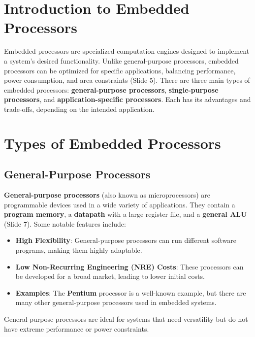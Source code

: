 \documentclass[
  14pt,
  a4paper,
  numbers=noendperiod,
  headinclude=true,
  footinclude=true,
  DIV=calc]{scrreprt}
\begin{document}
\section{Introduction to Embedded
Processors}\label{introduction-to-embedded-processors}

Embedded processors are specialized computation engines designed to
implement a system's desired functionality. Unlike general-purpose
processors, embedded processors can be optimized for specific
applications, balancing performance, power consumption, and area
constraints (Slide 5). There are three main types of embedded
processors: \textbf{general-purpose processors}, \textbf{single-purpose
processors}, and \textbf{application-specific processors}. Each has its
advantages and trade-offs, depending on the intended application.

\section{Types of Embedded
Processors}\label{types-of-embedded-processors}

\subsection{General-Purpose
Processors}\label{general-purpose-processors}

\textbf{General-purpose processors} (also known as microprocessors) are
programmable devices used in a wide variety of applications. They
contain a \textbf{program memory}, a \textbf{datapath} with a large
register file, and a \textbf{general ALU} (Slide 7). Some notable
features include:

\begin{itemize}
\item
  \textbf{High Flexibility}: General-purpose processors can run
  different software programs, making them highly adaptable.
\item
  \textbf{Low Non-Recurring Engineering (NRE) Costs}: These processors
  can be developed for a broad market, leading to lower initial costs.
\item
  \textbf{Examples}: The \textbf{Pentium} processor is a well-known
  example, but there are many other general-purpose processors used in
  embedded systems.
\end{itemize}

General-purpose processors are ideal for systems that need versatility
but do not have extreme performance or power constraints.
\end{document}
